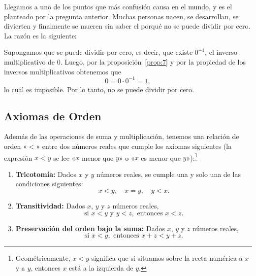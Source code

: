 \documentclass[12pt,a4paper]{book}
\begin{document}
    \begin{observacion}\label{obs:3}
        Llegamos a
        uno de los puntos que más confusión causa en el mundo, y es el planteado
        por la pregunta anterior. Muchas personas nacen, se desarrollan, se divierten
        y finalmente se mueren sin saber el porqué no se puede dividir por cero. La
        razón es la siguiente:

        Supongamos que se puede dividir por cero, es decir, que existe $0^{-1}$, el
        inverso multiplicativo de $0$. Luego, por la proposición~\ref{prop:7} y por la propiedad
        de los inversos multiplicativos obtenemos que
        \begin{equation*}
            0=0\cdot 0^{-1}=1,
        \end{equation*}
        lo cual es imposible. Por lo tanto, no se puede dividir por cero.
    \end{observacion}

    \subsection{Axiomas de Orden}\label{subsec:axiomas-orden}

    Además de las operaciones de suma y multiplicación, tenemos una relación
    de orden «$<$» entre dos números reales que cumple los axiomas siguientes
    (la expresión $x<y$ se lee «$x$ menor que $y$» o «$x$ es menor que $y$»):\footnote{Geométricamente, $x<y$ significa que si situamos sobre la recta numérica a $x$ y a $y$,
    entonces $x$ está a la izquierda de $y$.}
    \begin{enumerate}[resume*=axiomas]
        \item \textbf{Tricotomía:} Dados $x$ y $y$ números reales, se cumple una y solo una de las
        condiciones siguientes:
        \begin{equation*}
            x<y,\quad x=y,\quad y<x.
        \end{equation*}
        \item \textbf{Transitividad:} Dados $x$, $y$ y $z$ números reales,
        \begin{equation*}
            \text{si }x<y\text{ y }y<z,\text{ entonces }x<z.
        \end{equation*}
        \item \textbf{Preservación del orden bajo la suma:} Dados $x$, $y$ y $z$ números reales,
        \begin{equation*}
            \text{si }x<y,\text{ entonces }x+z<y+z.
        \end{equation*}
    \end{enumerate}
\end{document}
